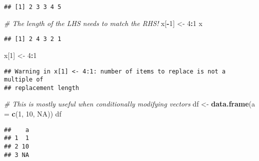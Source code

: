 \documentclass[
]{book}
\newenvironment{Shaded}{\begin{snugshade}}{\end{snugshade}}
\newcommand{\CommentTok}[1]{\textcolor[rgb]{0.56,0.35,0.01}{\textit{#1}}}
\newcommand{\DataTypeTok}[1]{\textcolor[rgb]{0.13,0.29,0.53}{#1}}
\newcommand{\DecValTok}[1]{\textcolor[rgb]{0.00,0.00,0.81}{#1}}
\newcommand{\KeywordTok}[1]{\textcolor[rgb]{0.13,0.29,0.53}{\textbf{#1}}}
\newcommand{\NormalTok}[1]{#1}
\newcommand{\OperatorTok}[1]{\textcolor[rgb]{0.81,0.36,0.00}{\textbf{#1}}}
\newcommand{\OtherTok}[1]{\textcolor[rgb]{0.56,0.35,0.01}{#1}}
\newcommand{\StringTok}[1]{\textcolor[rgb]{0.31,0.60,0.02}{#1}}
\begin{document}
\begin{verbatim}
## [1] 2 3 3 4 5
\end{verbatim}

\begin{Shaded}
\begin{Highlighting}[]
\CommentTok{\# The length of the LHS needs to match the RHS!}
\NormalTok{x[}\OperatorTok{{-}}\DecValTok{1}\NormalTok{] \textless{}{-}}\StringTok{ }\DecValTok{4}\OperatorTok{:}\DecValTok{1}
\NormalTok{x}
\end{Highlighting}
\end{Shaded}

\begin{verbatim}
## [1] 2 4 3 2 1
\end{verbatim}

\begin{Shaded}
\begin{Highlighting}[]
\NormalTok{x[}\DecValTok{1}\NormalTok{] \textless{}{-}}\StringTok{ }\DecValTok{4}\OperatorTok{:}\DecValTok{1}
\end{Highlighting}
\end{Shaded}

\begin{verbatim}
## Warning in x[1] <- 4:1: number of items to replace is not a multiple of
## replacement length
\end{verbatim}

\begin{Shaded}
\begin{Highlighting}[]
\CommentTok{\# This is mostly useful when conditionally modifying vectors}
\NormalTok{df \textless{}{-}}\StringTok{ }\KeywordTok{data.frame}\NormalTok{(}\DataTypeTok{a =} \KeywordTok{c}\NormalTok{(}\DecValTok{1}\NormalTok{, }\DecValTok{10}\NormalTok{, }\OtherTok{NA}\NormalTok{))}
\NormalTok{df}
\end{Highlighting}
\end{Shaded}

\begin{verbatim}
##    a
## 1  1
## 2 10
## 3 NA
\end{verbatim}

\begin{Shaded}
\end{Shaded}
\end{document}
